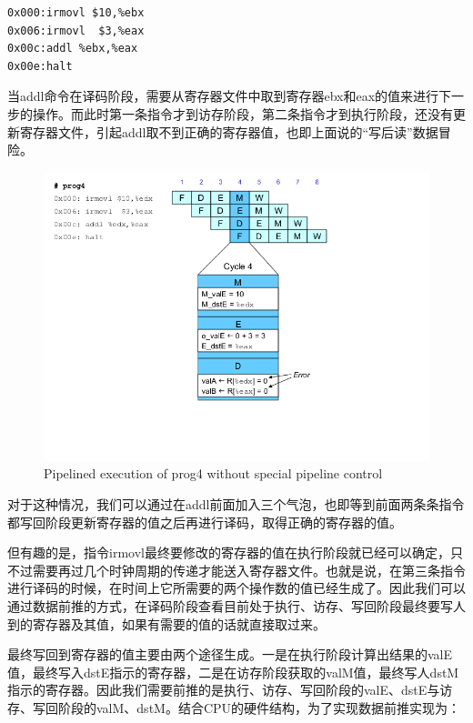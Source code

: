 \documentclass[12pt]{article}
\begin{document}
\begin{CJK*}{GB}{gbsn}
\begin{verbatim}
0x000:irmovl $10,%ebx
0x006:irmovl  $3,%eax
0x00c:addl %ebx,%eax
0x00e:halt
\end{verbatim}

当addl命令在译码阶段，需要从寄存器文件中取到寄存器ebx和eax的值来进行下一步的操作。而此时第一条指令才到访存阶段，第二条指令才到执行阶段，还没有更新寄存器文件，引起addl取不到正确的寄存器值，也即上面说的``写后读''数据冒险。

\begin{figure}[htbp]
\centering
\includegraphics{img/prog4-uncontrol.png}
\caption{Pipelined execution of prog4 without special pipeline control}
\end{figure}

对于这种情况，我们可以通过在addl前面加入三个气泡，也即等到前面两条条指令都写回阶段更新寄存器的值之后再进行译码，取得正确的寄存器的值。

但有趣的是，指令irmovl最终要修改的寄存器的值在执行阶段就已经可以确定，只不过需要再过几个时钟周期的传递才能送入寄存器文件。也就是说，在第三条指令进行译码的时候，在时间上它所需要的两个操作数的值已经生成了。因此我们可以通过数据前推的方式，在译码阶段查看目前处于执行、访存、写回阶段最终要写人到的寄存器及其值，如果有需要的值的话就直接取过来。

最终写回到寄存器的值主要由两个途径生成。一是在执行阶段计算出结果的valE值，最终写入dstE指示的寄存器，二是在访存阶段获取的valM值，最终写人dstM指示的寄存器。因此我们需要前推的是执行、访存、写回阶段的valE、dstE与访存、写回阶段的valM、dstM。结合CPU的硬件结构，为了实现数据前推实现为：


\end{CJK*}
\end{document}
